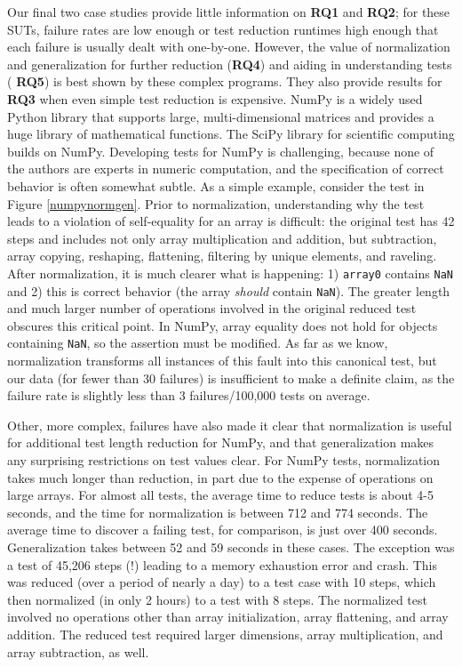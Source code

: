 Our final two case studies provide little information on {\bf RQ1} and
{\bf RQ2}; for these SUTs, failure rates are low enough or test
reduction runtimes high enough that each failure is usually dealt with
one-by-one.  However, the value of normalization and generalization
for further reduction ({\bf RQ4}) and aiding in understanding tests ({\bf
  RQ5}) is best shown by these complex programs.  They also provide
results for {\bf RQ3} when even simple test reduction is expensive.
NumPy \cite{NumPy} is a widely used Python library that
supports large, multi-dimensional matrices and provides a huge library
of mathematical functions.  The SciPy library for scientific
computing builds on NumPy.  Developing tests for NumPy is challenging,
because none of the authors are experts in numeric computation, and
the specification of correct behavior is often somewhat subtle.  As a
simple example, consider the test in Figure \ref{numpynormgen}.  Prior to
normalization, understanding why the test leads to a violation of
self-equality for an array is difficult: the original test has 42
steps and includes not only array multiplication and addition, but
subtraction, array copying, reshaping, flattening,  filtering by
unique elements, and raveling.  After
normalization, it is much clearer what is happening: 1) {\tt array0}
contains {\tt NaN} and 2) this is correct behavior (the array
\emph{should} contain {\tt NaN}).  The greater length and much larger
number of operations involved in the original reduced test
obscures this critical point.  In NumPy, array equality does not hold
for objects containing {\tt NaN}, so the assertion must be modified.
As far as we know, normalization transforms all instances of this
fault into this canonical test, but our data (for fewer than 30
failures) is insufficient to make a definite claim, as the failure rate
is slightly less than 3 failures/100,000 tests on average.

Other, more complex, failures have also made it clear that
normalization is useful for additional test length reduction for
NumPy, and that generalization makes any surprising restrictions on
test values clear.  For NumPy tests, normalization takes much longer
than reduction, in part due to the expense of operations on large
arrays.  For almost all tests, the average time to reduce tests
is about 4-5 seconds, and the time for normalization is between 712
and 774 seconds.  The average time to discover a failing test,
for comparison, is just over 400 seconds.  Generalization takes
between 52 and 59 seconds in these cases.  The exception was a test of 45,206 steps (!)  leading to a memory exhaustion error and
crash.  This was reduced (over a period of nearly a day) to a test
case with 10 steps, which then normalized (in only 2 hours) to a test
with 8 steps.  The normalized test involved no operations other than array
initialization, array flattening, and array
addition.  The reduced test required larger dimensions, array
multiplication, and array subtraction, as well.  



